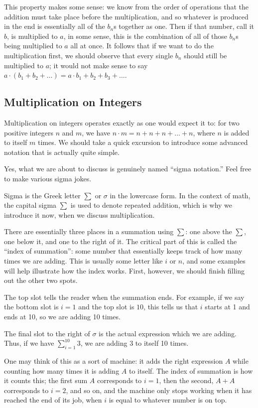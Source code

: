 \documentclass[openany]{book}
\begin{document}
This property makes some sense: we know from the order of operations that the addition must take place before the multiplication, and so whatever is produced in the end is essentially all of the $b_{n}$s together as one. Then if that number, call it $b$, is multiplied to $a$, in some sense, this is the combination of all of those $b_{n}$s being multiplied to $a$ all at once. It follows that if we want to do the multiplication first, we should observe that every single $b_{n}$ should still be multiplied to $a$; it would not make sense to say $a\cdot(b_{1}+b_{2}+\ldots) = a\cdot b_{1}+b_{2}+b_{3}+\ldots$.
\subsection{Multiplication on Integers}
Multiplication on integers operates exactly as one would expect it to: for two positive integers $n$ and $m$, we have $n\cdot m = n+n+n+\ldots+n$, where $n$ is added to itself $m$ times. We should take a quick excursion to introduce some advanced notation that is actually quite simple.
\begin{definition}
	Yes, what we are about to discuss is genuinely named ``sigma notation.'' Feel free to make various sigma jokes.\par
	Sigma is the Greek letter $\sum$ or $\sigma$ in the lowercase form. In the context of math, the capital sigma $\sum$ is used to denote repeated addition, which is why we introduce it now, when we discuss multiplication.\par
	There are essentially three places in a summation using $\sum$: one above the $\sum$, one below it, and one to the right of it. The critical part of this is called the ``index of summation'': some number that essentially keeps track of how many times we are adding. This is usually some letter like $i$ or $n$, and some examples will help illustrate how the index works. First, however, we should finish filling out the other two spots.\par
	The top slot tells the reader when the summation ends. For example, if we say the bottom slot is $i=1$ and the top slot is $10$, this tells us that $i$ starts at 1 and ends at 10, so we are adding 10 times.\par
	The final slot to the right of $\sigma$ is the actual expression which we are adding. Thus, if we have $\sum_{i=1}^{10}3$, we are adding 3 to itself 10 times.\par
	One may think of this as a sort of machine: it adds the right expression $A$ while counting how many times it is adding $A$ to itself. The index of summation is how it counts this; the first sum $A$ corresponds to $i=1$, then the second, $A+A$ corresponds to $i=2$, and so on, and the machine only stops working when it has reached the end of its job, when $i$ is equal to whatever number is on top.
\end{definition}
\end{document}
